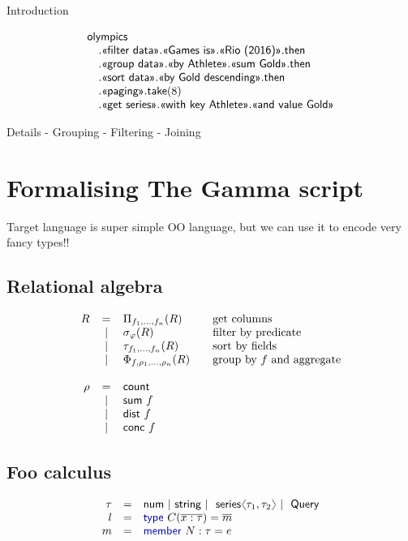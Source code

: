 \documentclass[a4paper,UKenglish]{lipics-v2016}
\newcommand{\langl}{\begin{picture}(4.5,7)
\put(1.1,2.5){\rotatebox{60}{\line(1,0){5.5}}}
\put(1.1,2.5){\rotatebox{300}{\line(1,0){5.5}}}
\end{picture}}
\newcommand{\rangl}{\begin{picture}(4.5,7)
\put(.9,2.5){\rotatebox{120}{\line(1,0){5.5}}}
\put(.9,2.5){\rotatebox{240}{\line(1,0){5.5}}}
\end{picture}}
\newcommand{\lsep}{~|~}
\newcommand{\kvd}[1]{\textnormal{\textcolor{kvdclr}{\sffamily #1}}}
\newcommand{\ident}[1]{\textnormal{\sffamily #1}}
\newcommand{\qident}[1]{\textnormal{\sffamily \guillemotleft #1\guillemotright}}
\begin{document}
Introduction

\begin{equation*}
\begin{array}{l}
\ident{olympics}\\
\quad.\qident{filter data}.\qident{Games is}.\qident{Rio (2016)}.\ident{then}\\
\quad.\qident{group data}.\qident{by Athlete}.\qident{sum Gold}.\ident{then}\\
\quad.\qident{sort data}.\qident{by Gold descending}.\ident{then}\\
\quad.\qident{paging}.\ident{take}(8)\\
\quad.\qident{get series}.\qident{with key Athlete}.\qident{and value Gold}
\end{array}
\end{equation*}

Details
 - Grouping
 - Filtering
 - Joining


\section{Formalising The Gamma script}
\label{sec:foo}


Target language is super simple OO language, but we can use it to encode very fancy types!!

\subsection{Relational algebra}
\begin{equation*}
\begin{array}{rclll}
  R & = & \Pi_{f_1, \ldots, f_n} (R) &&\textnormal{get columns}\\
   & \lsep & \sigma_\varphi (R) &&\textnormal{filter by predicate}\\
   & \lsep & \tau_{f_1, \ldots, f_n}(R) &&\textnormal{sort by fields}\\
   & \lsep & \Phi_{f, \rho_1, \ldots, \rho_n} (R) &&\textnormal{group by $f$ and aggregate}\\
   \\
  \rho & = & \ident{count}  \\
   & \lsep & \ident{sum}~f    \\       
   & \lsep & \ident{dist}~f\\
   & \lsep & \ident{conc}~f\\
\end{array}
\end{equation*}
\subsection{Foo calculus}
\begin{equation*}
\begin{array}{rcl}
 \tau &=& \ident{num} \lsep \ident{string} \lsep \ident{series}\langl \tau_1, \tau_2 \rangl \lsep \ident{Query}\\
 l &=& \kvd{type}~C(\overline{x:\tau}) = \overline{m} \\[0.0em]
 m &=& \kvd{member}~N:\tau= e
\end{array}
\end{equation*}
\end{document}
